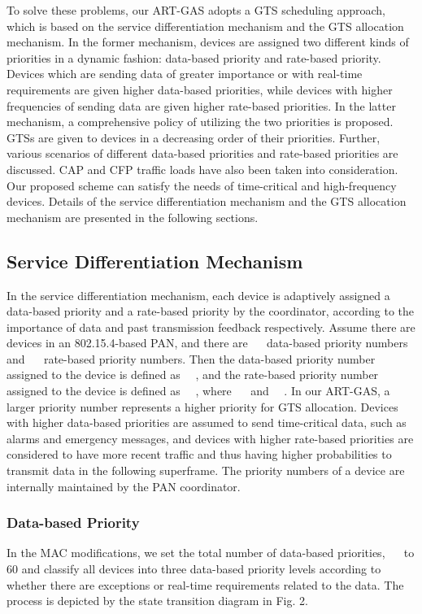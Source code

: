 \documentclass[letterpaper]{sig-alternate-10pt}
\begin{document}
To solve these problems, our ART-GAS adopts a GTS scheduling approach, which is based on the service differentiation mechanism and the GTS allocation mechanism. In the former mechanism, devices are assigned two different kinds of priorities in a dynamic fashion: data-based priority and rate-based priority. Devices which are sending data of greater importance or with real-time requirements are given higher data-based priorities, while devices with higher frequencies of sending data are given higher rate-based priorities. In the latter mechanism, a comprehensive policy of utilizing the two priorities is proposed. GTSs are given to devices in a decreasing order of their priorities. Further, various scenarios of different data-based priorities and rate-based priorities are discussed. CAP and CFP traffic loads have also been taken into consideration. Our proposed scheme can satisfy the needs of time-critical and high-frequency devices. Details of the service differentiation mechanism and the GTS allocation mechanism are presented in the following sections.

\subsection{Service Differentiation Mechanism}
In the service differentiation mechanism, each device is adaptively assigned a data-based priority and a rate-based priority by the coordinator, according to the importance of data and past transmission feedback respectively. Assume there are  devices in an 802.15.4-based PAN, and there are ~~ data-based priority numbers and ~~ rate-based priority numbers. Then the data-based priority number assigned to the device  is defined as ~~, and the rate-based priority number assigned to the device  is defined as ~~, where ~~ and ~~. In our ART-GAS, a larger priority number represents a higher priority for GTS allocation. Devices with higher data-based priorities are assumed to send time-critical data, such as alarms and emergency messages, and devices with higher rate-based priorities are considered to have more recent traffic and thus having higher probabilities to transmit data in the following superframe. The priority numbers of a device are internally maintained by the PAN coordinator.

\subsubsection{Data-based Priority}
In the MAC modifications, we set the total number of data-based priorities, ~~ to 60 and classify all devices into three data-based priority levels according to whether there are exceptions or real-time requirements related to the data. The process is depicted by the state transition diagram in Fig. 2.
\end{document}
